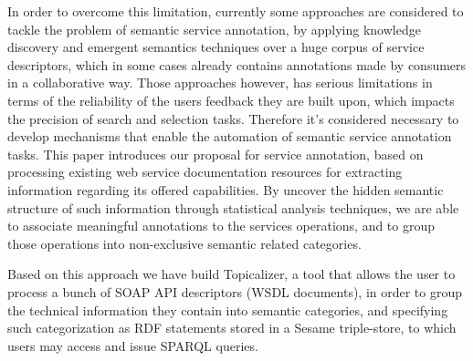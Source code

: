 In order to overcome this limitation, currently some approaches are considered to tackle the problem of semantic service annotation, by applying knowledge discovery and emergent semantics techniques over a huge corpus of service descriptors, which in some cases already contains annotations made by consumers in a collaborative way. Those approaches however, has serious limitations in terms of the reliability of the users feedback they are built upon, which impacts the precision of search and selection tasks. Therefore it’s considered necessary to develop mechanisms that enable the automation of semantic service annotation tasks.
This paper introduces our proposal for service annotation, based on processing existing web service documentation resources for extracting information regarding its offered capabilities. By uncover the hidden semantic structure of such information through statistical analysis techniques, we are able to associate meaningful annotations to the services operations, and to group those operations into non-exclusive semantic related categories.

Based on this approach we have build Topicalizer, a tool that allows the user to process a bunch of SOAP API descriptors (WSDL documents), in order to group the technical information they contain into semantic categories, and specifying such categorization as RDF statements stored in a Sesame triple-store, to which users may access and issue SPARQL queries.
